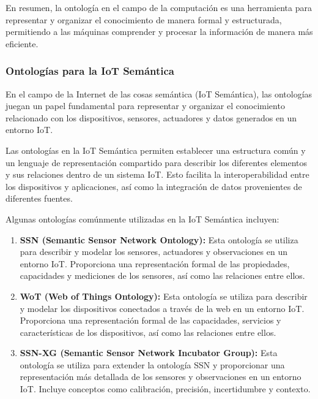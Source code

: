 \documentclass[12pt]{article}
\begin{document}
En resumen, la ontología en el campo de la computación es una herramienta para representar y organizar el conocimiento de manera formal y estructurada, permitiendo a las máquinas comprender y procesar la información de manera más eficiente.

\subsubsection{Ontologías para la IoT Semántica}

En el campo de la Internet de las cosas semántica (IoT Semántica), las ontologías juegan un papel fundamental para representar y organizar el conocimiento relacionado con los dispositivos, sensores, actuadores y datos generados en un entorno IoT.

Las ontologías en la IoT Semántica permiten establecer una estructura común y un lenguaje de representación compartido para describir los diferentes elementos y sus relaciones dentro de un sistema IoT. Esto facilita la interoperabilidad entre los dispositivos y aplicaciones, así como la integración de datos provenientes de diferentes fuentes.

Algunas ontologías comúnmente utilizadas en la IoT Semántica incluyen:

\begin{enumerate}
    \item {
       
       \textbf{SSN (Semantic Sensor Network Ontology):} Esta ontología se utiliza para describir y modelar los sensores, actuadores y observaciones en un entorno IoT. Proporciona una representación formal de las propiedades, capacidades y mediciones de los sensores, así como las relaciones entre ellos.\citep{ref49}
    }
    \item {
        \textbf{WoT (Web of Things Ontology):} Esta ontología se utiliza para describir y modelar los dispositivos conectados a través de la web en un entorno IoT. Proporciona una representación formal de las capacidades, servicios y características de los dispositivos, así como las relaciones entre ellos.\citep{ref48}
    }
    \item {
        \textbf{SSN-XG (Semantic Sensor Network Incubator Group):} Esta ontología se utiliza para extender la ontología SSN y proporcionar una representación más detallada de los sensores y observaciones en un entorno IoT. Incluye conceptos como calibración, precisión, incertidumbre y contexto.\citep{ref23}
    }
        
\end{enumerate}
\end{document}
